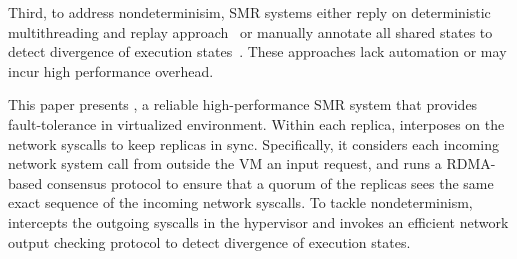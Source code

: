 Third, to address nondeterminisim, SMR systems either reply on deterministic multithreading and replay 
approach~\cite{rex:eurosys14} or manually annotate all shared states to detect divergence of execution 
states~\cite{eve:osdi12}. These approaches lack automation or may incur high performance overhead.

This paper presents \xxx, a reliable high-performance SMR system that provides fault-tolerance 
in virtualized environment. Within each replica, \xxx interposes on the network syscalls to keep 
replicas in sync. Specifically, it considers each incoming network system call from outside the VM 
an input request, and runs a RDMA-based \paxos consensus protocol to ensure that a quorum of the 
replicas sees the same exact sequence of the incoming network syscalls. To tackle nondeterminism, 
\xxx intercepts the outgoing syscalls in the hypervisor and invokes an efficient network output 
checking protocol to detect divergence of execution states.

